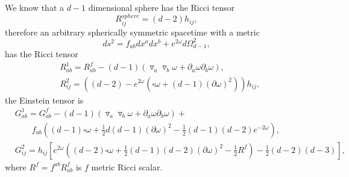 \documentclass[a4paper,12pt]{article}
\begin{document}
We know that a $d-1$ dimensional sphere has the Ricci tensor
\begin{equation}
R^{sphere}_{ij} = (d - 2) h_{ij},
\end{equation}
therefore an arbitrary spherically symmetric spacetime with a metric
\begin{equation}
	ds^2 = f_{ab} dx^a dx^b + e^{2\omega} d\Omega^2_{d-1},
\end{equation}
has the Ricci tensor
\begin{subequations}
	\begin{align}
		&R^1_{ab} = R^f_{ab} - (d-1)(\triangledown_a \triangledown_b\omega + \partial_a\omega\partial_b\omega),\\
		&R^2_{ij} = ((d-2) - e^{2\omega} (\square\omega + (d-1)(\partial \omega)^2)) h_{ij},
	\end{align}
\end{subequations}
the Einstein tensor is
\begin{subequations}
\label{eq:GEinsteinDecomp}
\begin{align}
	&G^1_{ab} = G^f_{ab} - (d-1)(\triangledown_a\triangledown_b \omega + \partial_a\omega\partial_b \omega) +\\\nonumber
	&\qquad f_{ab} \left((d-1) \square\omega +\frac{1}{2}d(d-1)(\partial\omega)^2 - \frac{1}{2}(d-1)(d-2)e^{-2\omega}\right),\\
	&G^2_{ij} = h_{ij}\left[e^{2\omega}\left((d-2)\square\omega + \frac{1}{2}(d-1)(d-2)(\partial\omega)^2 - \frac{1}{2}R^f\right) - \frac{1}{2}(d-2)(d-3)\right],
\end{align}
\end{subequations}
where $R^f = f^{ab} R_{ab}^f$ is $f$ metric Ricci scalar.
\end{document}
